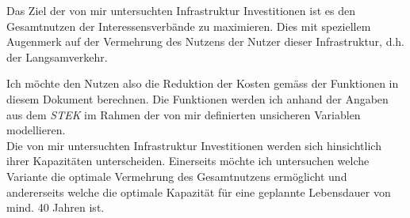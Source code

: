 Das Ziel der von mir untersuchten Infrastruktur Investitionen ist es den Gesamtnutzen der Interessensverbände zu maximieren. \newline Dies mit speziellem Augenmerk auf der Vermehrung des Nutzens der Nutzer dieser Infrastruktur, d.h. der Langsamverkehr. 

Ich möchte den Nutzen also die Reduktion der Kosten gemäss der Funktionen in diesem Dokument berechnen. 
Die Funktionen werden ich anhand der Angaben aus dem \textit{STEK} im Rahmen der von mir definierten unsicheren Variablen modellieren. \\ [2ex]
Die von mir untersuchten Infrastruktur Investitionen werden sich hinsichtlich ihrer Kapazitäten unterscheiden. Einerseits möchte ich untersuchen welche Variante die optimale Vermehrung des Gesamtnutzens ermöglicht und andererseits welche die optimale Kapazität für eine geplannte Lebensdauer von mind. 40 Jahren ist. 


%

